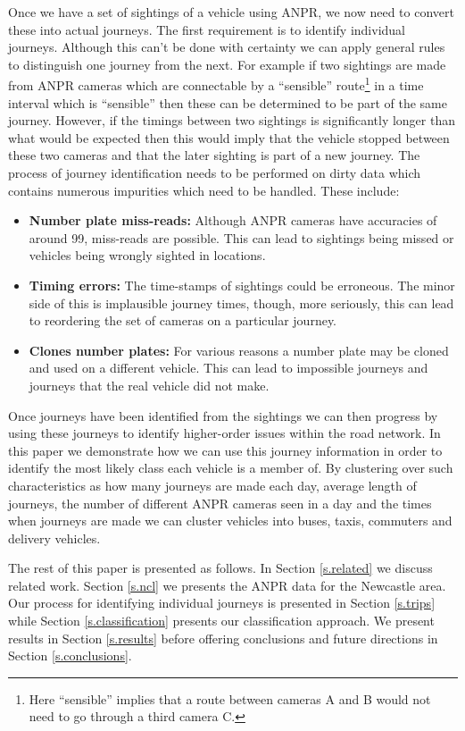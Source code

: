 Once we have a set of sightings of a vehicle using ANPR, we now need to convert these into actual journeys. The first requirement is to identify individual journeys. Although this can't be done with certainty we can apply general rules to distinguish one journey from the next. For example if two sightings are made from ANPR cameras which are connectable by a ``sensible'' route\footnote{Here ``sensible'' implies that a route between cameras A and B would not need to go through a third camera C.} in a time interval which is ``sensible'' then these can be determined to be part of the same journey. However, if the timings between two sightings is significantly longer than what would be expected then this would imply that the vehicle stopped between these two cameras and that the later sighting is part of a new journey. The process of journey identification needs to be performed on dirty data which contains numerous impurities which need to be handled. These include:

\begin{itemize}
	\item {\bf Number plate miss-reads:} Although ANPR cameras have accuracies of around 99, miss-reads are possible. This can lead to sightings being missed or vehicles being wrongly sighted in locations.
	\item {\bf Timing errors:} The time-stamps of sightings could be erroneous. The minor side of this is implausible journey times, though, more seriously, this can lead to reordering the set of cameras on a particular journey.
	\item {\bf Clones number plates:} For various reasons a number plate may be cloned and used on a different vehicle. This can lead to impossible journeys and journeys that the real vehicle did not make.
\end{itemize}

Once journeys have been identified from the sightings we can then progress by using these journeys to identify higher-order issues within the road network. In this paper we demonstrate how we can use this journey information in order to identify the most likely class each vehicle is a member of. By clustering over such characteristics as how many journeys are made each day, average length of journeys, the number of different ANPR cameras seen in a day and the times when journeys are made we can cluster vehicles into buses, taxis, commuters and delivery vehicles.

The rest of this paper is presented as follows. In Section \ref{s.related} we discuss related work. Section \ref{s.ncl} we presents the ANPR data for the Newcastle area. Our process for identifying individual journeys is presented in Section \ref{s.trips} while Section \ref{s.classification} presents our classification approach. We present results in Section \ref{s.results} before offering conclusions and future directions in Section \ref{s.conclusions}.

